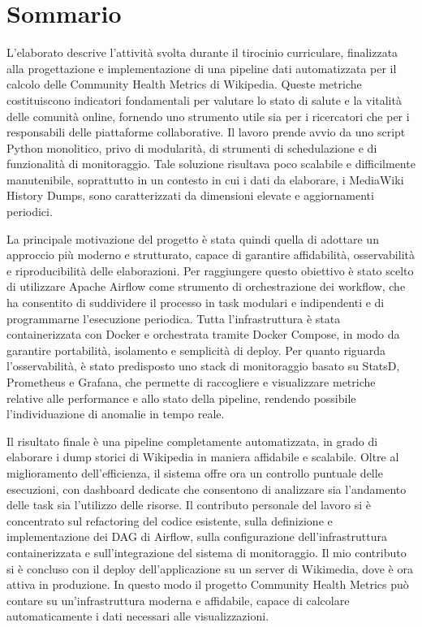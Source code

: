 \chapter*{Sommario} %
\label{sommario}


L’elaborato descrive l’attività svolta durante il tirocinio curriculare,
finalizzata alla progettazione e implementazione di una pipeline dati automatizzata per il calcolo delle Community Health Metrics di Wikipedia.
Queste metriche costituiscono indicatori fondamentali per valutare lo stato di salute e la vitalità delle comunità online, fornendo uno strumento utile sia per i ricercatori che per i responsabili delle piattaforme collaborative.
Il lavoro prende avvio da uno script Python monolitico, privo di modularità, di strumenti di schedulazione e di funzionalità di monitoraggio.
Tale soluzione risultava poco scalabile e difficilmente manutenibile, soprattutto in un contesto in cui i dati da elaborare, i MediaWiki History Dumps, sono caratterizzati da dimensioni elevate e aggiornamenti periodici.


La principale motivazione del progetto è stata quindi quella di adottare un approccio più moderno e strutturato, capace di garantire affidabilità, osservabilità e riproducibilità delle elaborazioni.
Per raggiungere questo obiettivo è stato scelto di utilizzare Apache Airflow come strumento di orchestrazione dei workflow,
che ha consentito di suddividere il processo in task modulari e indipendenti e di programmarne l’esecuzione periodica.
Tutta l’infrastruttura è stata containerizzata con Docker e orchestrata tramite Docker Compose, in modo da garantire portabilità, isolamento e semplicità di deploy.
Per quanto riguarda l’osservabilità, è stato predisposto uno stack di monitoraggio basato su StatsD, Prometheus e Grafana, che permette di raccogliere e visualizzare metriche relative alle performance e allo stato della pipeline, rendendo possibile l’individuazione di anomalie in tempo reale.


Il risultato finale è una pipeline completamente automatizzata, in grado di elaborare i dump storici di Wikipedia in maniera affidabile e scalabile. Oltre al miglioramento dell’efficienza,
il sistema offre ora un controllo puntuale delle esecuzioni, con dashboard dedicate che consentono di analizzare sia l'andamento delle task sia l'utilizzo delle risorse.
Il contributo personale del lavoro si è concentrato sul refactoring del codice esistente, sulla definizione e implementazione dei DAG di Airflow, sulla configurazione dell'infrastruttura containerizzata e sull'integrazione del sistema di monitoraggio.
Il mio contributo si è concluso con il deploy dell’applicazione su un server di Wikimedia,
dove è ora attiva in produzione. In questo modo il progetto Community Health Metrics può contare su un’infrastruttura moderna e affidabile,
capace di calcolare automaticamente i dati necessari alle visualizzazioni.


\newpage
